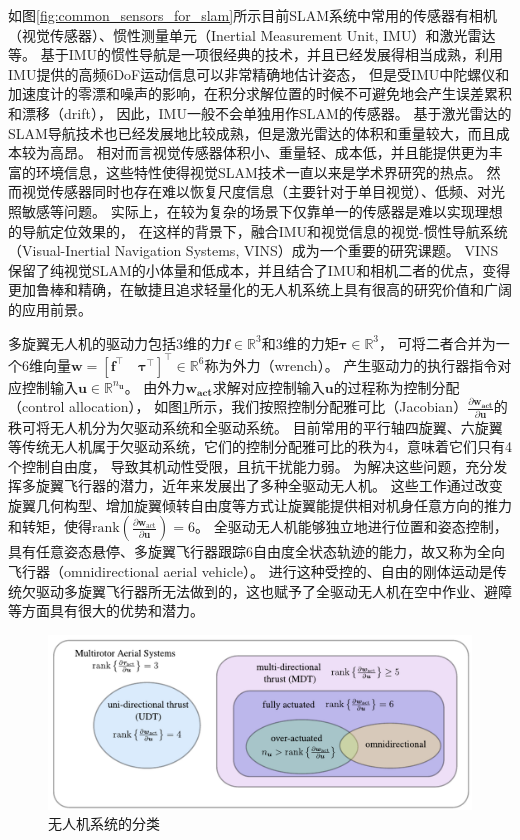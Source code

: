 如图\ref{fig:common_sensors_for_slam}所示目前SLAM系统中常用的传感器有相机（视觉传感器）、惯性测量单元（Inertial Measurement Unit, IMU）和激光雷达等。
基于IMU的惯性导航是一项很经典的技术，并且已经发展得相当成熟，利用IMU提供的高频6DoF运动信息可以非常精确地估计姿态，
但是受IMU中陀螺仪和加速度计的零漂和噪声的影响，在积分求解位置的时候不可避免地会产生误差累积和漂移（drift），
因此，IMU一般不会单独用作SLAM的传感器。
基于激光雷达的SLAM导航技术也已经发展地比较成熟，但是激光雷达的体积和重量较大，而且成本较为高昂。
相对而言视觉传感器体积小、重量轻、成本低，并且能提供更为丰富的环境信息，这些特性使得视觉SLAM技术一直以来是学术界研究的热点。
然而视觉传感器同时也存在难以恢复尺度信息（主要针对于单目视觉）、低频、对光照敏感等问题。
实际上，在较为复杂的场景下仅靠单一的传感器是难以实现理想的导航定位效果的，
在这样的背景下，融合IMU和视觉信息的视觉-惯性导航系统（Visual-Inertial Navigation Systems, VINS）成为一个重要的研究课题。
VINS保留了纯视觉SLAM的小体量和低成本，并且结合了IMU和相机二者的优点，变得更加鲁棒和精确，在敏捷且追求轻量化的无人机系统上具有很高的研究价值和广阔的应用前景。

多旋翼无人机的驱动力包括3维的力$\bm{f} \in \mathbb{R}^3$和3维的力矩$\bm{\tau} \in \mathbb{R}^3$，
可将二者合并为一个6维向量$\bm{w} = \left[\bm{f}^\top \quad \bm{\tau}^\top\right]^\top \in \mathbb{R}^6$称为外力（wrench）。
产生驱动力的执行器指令对应控制输入$\bm{u} \in \mathbb{R}^{n_{\bm{u}}}$。
由外力$\bm{w_\text{act}}$求解对应控制输入$\bm{u}$的过程称为控制分配（control allocation），
如图\ref{fig:uav_classification}所示，我们按照控制分配雅可比（Jacobian）$\frac{\partial \bm{w_\text{act}}}{\partial \bm{u}}$的秩可将无人机分为欠驱动系统和全驱动系统\cite{bodie2022omnidirectional}。
目前常用的平行轴四旋翼、六旋翼等传统无人机属于欠驱动系统，它们的控制分配雅可比的秩为4，意味着它们只有4个控制自由度，
导致其机动性受限，且抗干扰能力弱。
为解决这些问题，充分发挥多旋翼飞行器的潜力，近年来发展出了多种全驱动无人机。
这些工作通过改变旋翼几何构型、增加旋翼倾转自由度等方式让旋翼能提供相对机身任意方向的推力和转矩，使得$\text{rank}(\frac{\partial \bm{w}_\text{act}}{\partial \bm{u}}) = 6$。
全驱动无人机能够独立地进行位置和姿态控制，具有任意姿态悬停、多旋翼飞行器跟踪6自由度全状态轨迹的能力，故又称为全向飞行器（omnidirectional aerial vehicle）。
进行这种受控的、自由的刚体运动是传统欠驱动多旋翼飞行器所无法做到的，这也赋予了全驱动无人机在空中作业、避障等方面具有很大的优势和潜力。

\begin{figure}[htbp]
    \centering
    \includegraphics[width = \textwidth]{figures/uav_classification.png}
    \caption{无人机系统的分类\cite{bodie2022omnidirectional}}
    \label{fig:uav_classification}
\end{figure}

